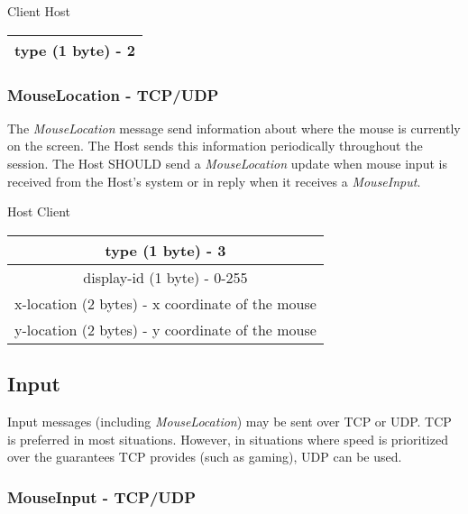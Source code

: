 \documentclass{article}
\begin{document}
    \begin{center}
        Client \textrightarrow Host\\
        \begin{tabular}{|c|}
            \hline
            type (1 byte) - 2 \\
            \hline
        \end{tabular}
    \end{center}

    \subsubsection{MouseLocation - TCP/UDP}

    The \emph{MouseLocation} message send information about where the mouse is currently on the screen.
    The Host sends this information periodically throughout the session.
    The Host SHOULD send a \emph{MouseLocation} update when mouse input is received from the Host's system or in reply when it receives a \emph{MouseInput}.

    \begin{center}
        Host \textrightarrow Client\\
        \begin{tabular}{|c|}
            \hline
            type (1 byte) - 3                                \\
            \hline
            display-id (1 byte) - 0-255                      \\
            \hline
            x-location (2 bytes) - x coordinate of the mouse \\
            \hline
            y-location (2 bytes) - y coordinate of the mouse \\
            \hline
        \end{tabular}
    \end{center}

    \subsection{Input}

    Input messages (including \emph{MouseLocation}) may be sent over TCP or UDP. TCP is preferred in most situations. However, in situations where speed is prioritized over the guarantees TCP provides (such as gaming), UDP can be used.

    \subsubsection{MouseInput - TCP/UDP}
\end{document}
